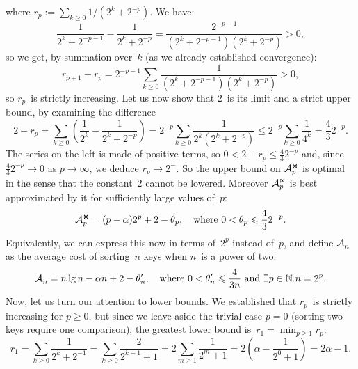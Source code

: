 \documentclass[a4paper,11pt,twoside,final]{book}
\theoremstyle{plain}
\begin{document}
where \(r_p := \sum_{k \geqslant 0}1/(2^{k}+2^{-p})\). We have:
\begin{equation*}
  \frac{1}{2^k + 2^{-p-1}} - \frac{1}{2^k + 2^{-p}}
  = \frac{2^{-p-1}}{(2^k + 2^{-p-1})(2^k + 2^{-p})} > 0,
\end{equation*}
so we get, by summation over~\(k\) (as we already established convergence):
\begin{equation*}
  r_{p+1} - r_p = 2^{-p-1}\sum_{k \geqslant 0}\frac{1}{(2^k + 2^{-p-1})(2^k +
    2^{-p})} > 0,
\end{equation*}
so \(r_p\)~is strictly increasing. Let us now show that \(2\)~is its limit
and a strict upper bound, by examining the difference
\begin{equation*}
  2 - r_p
  = \sum_{k \geqslant 0}\left(\frac{1}{2^k} - \frac{1}{2^k + 2^{-p}}\right)
  = 2^{-p}\sum_{k \geqslant 0}\frac{1}{2^k(2^k + 2^{-p})}
  \leqslant 2^{-p}\sum_{k \geqslant 0}\frac{1}{4^k}
  = \frac{4}{3}2^{-p}.
\end{equation*}
The series on the left is made of positive terms, so \(0 < 2 - r_p \leqslant
\tfrac{4}{3}2^{-p}\) and, since \(\tfrac{4}{3}2^{-p} \rightarrow 0\) as \(p \to
\infty\), we deduce \(r_p \rightarrow 2^{-}\). So the upper bound on
\(\mathcal{A}_{p}^{\Join}\) is optimal in the sense that the constant~\(2\) cannot be
lowered. Moreover \(\mathcal{A}_{p}^{\Join}\) is best approximated by it for sufficiently
large values of~\(p\):
\begin{equation*}
  \mathcal{A}_{p}^{\Join} = (p - \alpha) 2^p + 2 - \theta_p,
  \quad \text{where \(0 < \theta_p \leqslant \frac{4}{3}2^{-p}\)}.
\end{equation*}
Equivalently, we can express this now in terms of~\(2^p\) instead of~\(p\), and
define \(\mathcal{A}_{n}^{}\) as the average cost of sorting~\(n\) keys when \(n\)~is a
power of two:
\begin{equation*}
  \mathcal{A}_{n}^{} = n \lg n - \alpha n + 2 - \theta'_n,
  \quad \text{where \(0 < \theta'_n \leqslant \frac{4}{3n}\) and \(\exists
    p \in \mathbb{N}.n=2^p\).}
\end{equation*}
Now, let us turn our attention to lower bounds. We established that \(r_p\)~is
strictly increasing for \(p \geqslant 0\), but since we leave aside the trivial
case \(p=0\) (sorting two keys require one comparison), the greatest lower bound
is~\(r_1 = \min_{p \geqslant 1}r_p\):
\begin{equation*}
  r_1\!\! = \!\!\sum_{k \geqslant 0}\frac{1}{2^k + 2^{-1}}
  = \!\sum_{k \geqslant 0}\frac{2}{2^{k+1} + 1}
  = 2 \!\sum_{m \geqslant 1}\frac{1}{2^m + 1}
  = 2\left(\!\alpha - \frac{1}{2^0 + 1}\!\right)
  = 2\alpha - 1.
\end{equation*}
\end{document}

